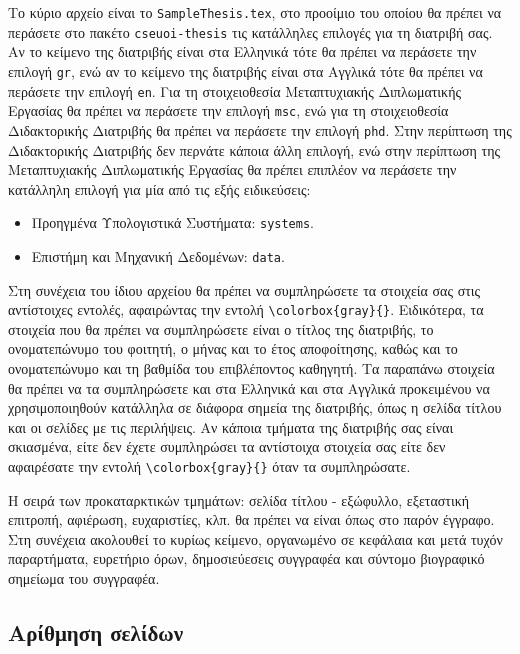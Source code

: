 Το κύριο αρχείο είναι το \texttt{SampleThesis.tex}, στο προοίμιο του οποίου 
θα πρέπει να περάσετε στο πακέτο \texttt{cseuoi-thesis} τις κατάλληλες 
επιλογές για τη διατριβή σας. Αν το κείμενο της διατριβής είναι στα Ελληνικά 
τότε θα πρέπει να περάσετε την επιλογή \texttt{gr}, ενώ αν το κείμενο της 
διατριβής είναι στα Αγγλικά τότε θα πρέπει να περάσετε την επιλογή \texttt{en}.
Για τη στοιχειοθεσία Μεταπτυχιακής Διπλωματικής Εργασίας θα πρέπει να περάσετε 
την επιλογή \texttt{msc}, ενώ για τη στοιχειοθεσία Διδακτορικής Διατριβής 
θα πρέπει να περάσετε την επιλογή \texttt{phd}.
Στην περίπτωση της Διδακτορικής Διατριβής δεν περνάτε κάποια άλλη επιλογή, ενώ
στην περίπτωση της Μεταπτυχιακής Διπλωματικής Εργασίας θα πρέπει επιπλέον να περάσετε 
την κατάλληλη επιλογή για μία από τις εξής ειδικεύσεις:
\begin{itemize}
	\item Προηγμένα Υπολογιστικά Συστήματα: \texttt{systems}.
	\item Επιστήμη και Μηχανική Δεδομένων: \texttt{data}.
\end{itemize}

Στη συνέχεια του ίδιου αρχείου θα πρέπει να συμπληρώσετε τα στοιχεία σας 
στις αντίστοιχες εντολές, αφαιρώντας την εντολή \verb|\colorbox{gray}{}|.
Ειδικότερα, τα στοιχεία που θα πρέπει να συμπληρώσετε είναι ο τίτλος της 
διατριβής, το ονοματεπώνυμο του φοιτητή, ο μήνας και το έτος αποφοίτησης, 
καθώς και το ονοματεπώνυμο και τη βαθμίδα του επιβλέποντος καθηγητή.
Τα παραπάνω στοιχεία θα πρέπει να τα συμπληρώσετε και στα Ελληνικά και στα 
Αγγλικά προκειμένου να χρησιμοποιηθούν κατάλληλα σε διάφορα σημεία της 
διατριβής, όπως η σελίδα τίτλου και οι σελίδες με τις περιλήψεις.
Αν κάποια τμήματα της διατριβής σας είναι σκιασμένα, είτε δεν έχετε 
συμπληρώσει τα αντίστοιχα στοιχεία σας είτε δεν αφαιρέσατε την εντολή 
\verb|\colorbox{gray}{}| όταν τα συμπληρώσατε.

 Η σειρά των προκαταρκτικών τμημάτων: σελίδα τίτλου - εξώφυλλο,
εξεταστική επιτροπή, αφιέρωση, ευχαριστίες,%
κλπ. θα πρέπει να είναι όπως στο παρόν έγγραφο.
 Στη συνέχεια ακολουθεί το κυρίως κείμενο, οργανωμένο σε κεφάλαια και μετά τυχόν παραρτήματα,
ευρετήριο όρων, δημοσιεύεσεις συγγραφέα και σύντομο βιογραφικό σημείωμα του συγγραφέα.

\subsection{Αρίθμηση σελίδων}
\label{subsec:pageNumbering}

